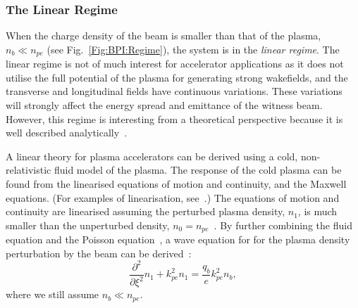 \subsubsection{The Linear Regime}
\label{Int:BPI:Lin}

When the charge density of the beam is smaller than that of the plasma, $n_{b} \ll n_{pe}$ (see Fig.~\ref{Fig:BPI:Regime}), the system is in the \textit{linear regime}. The linear regime is not of much interest for accelerator applications as it does not utilise the full potential of the plasma for generating strong wakefields, and the transverse and longitudinal fields have continuous variations. These variations will strongly affect the energy spread and emittance of the witness beam. However, this regime is interesting from a theoretical perspective because it is well described analytically~\cite{muggli:2017}.

A linear theory for plasma accelerators can be derived using a cold, non-relativistic fluid model of the plasma. The response of the cold plasma can be found from the linearised equations of motion and continuity, and the Maxwell equations. (For examples of linearisation, see~\cite{pecseli:2012,chen:1974}.) The equations of motion and continuity are linearised assuming the perturbed plasma density, $n_{1}$, is much smaller than the unperturbed density, $n_{0} = n_{pe}$~\cite{chen:1987}. By further combining the fluid equation and the Poisson equation~\cite{katsouleas:1987}, a wave equation for for the plasma density perturbation by the beam can be derived~\cite{chen:1987,muggli:2017}:
\begin{equation}
    \frac{\partial^{2}}{\partial\xi^{2}}n_{1} + k_{pe}^{2}n_{1} = \frac{q_{b}}{e}k_{pe}^{2}n_{b}, \label{EQ:BeamPlasmaWF}
\end{equation}
where we still assume $n_{b} \ll n_{pe}$.

